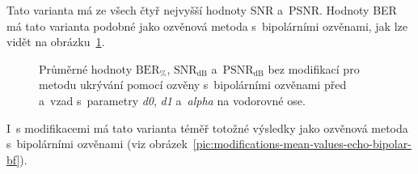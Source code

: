 Tato varianta má ze všech čtyř nejvyšší hodnoty SNR a~PSNR. Hodnoty BER má tato
varianta podobné jako ozvěnová metoda s~bipolárními ozvěnami, jak lze vidět na
obrázku~\ref{pic:no-mod-params-mean-values-echo-bipolar-bf}.

\begin{figure}[H]
    \table
    \centering
    \caption{Průměrné hodnoty $\mathrm{BER}_{\%}$, $\mathrm{SNR}_\mathrm{dB}$
    a~$\mathrm{PSNR}_\mathrm{dB}$ bez modifikací pro metodu ukrývání pomocí
    ozvěny s~bipolárními ozvěnami před a~vzad s~parametry \textit{d0},
    \textit{d1} a~\textit{alpha} na vodorovné ose.}
    \label{pic:no-mod-params-mean-values-echo-bipolar-bf}
\end{figure}

I~s modifikacemi má tato varianta téměř totožné výsledky jako ozvěnová metoda
s~bipolárními ozvěnami (viz
obrázek~\ref{pic:modifications-mean-values-echo-bipolar-bf}).

